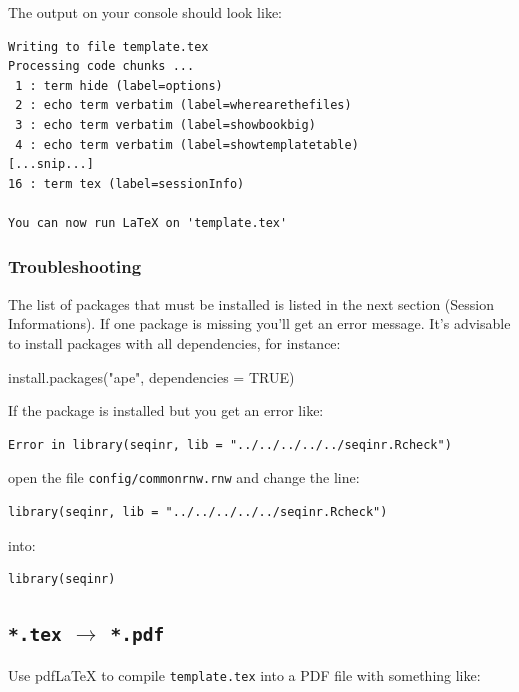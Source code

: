 \documentclass{article}
\begin{document}
The output on your \Rlogo{} console should look like:

\begin{verbatim}
Writing to file template.tex
Processing code chunks ...
 1 : term hide (label=options)
 2 : echo term verbatim (label=wherearethefiles)
 3 : echo term verbatim (label=showbookbig)
 4 : echo term verbatim (label=showtemplatetable)
[...snip...]
16 : term tex (label=sessionInfo)

You can now run LaTeX on 'template.tex'
\end{verbatim}

\subsubsection{Troubleshooting}

The list of \Rlogo{} packages that must be installed is listed
in the next section (Session Informations). 
If one package is missing you'll get an error message.
It's advisable to install packages with all dependencies, for instance:

\begin{Schunk}
\begin{Sinput}
 install.packages("ape", dependencies = TRUE)
\end{Sinput}
\end{Schunk}

If the \seqinr{} package is installed but you get an error like:

\begin{verbatim}
Error in library(seqinr, lib = "../../../../../seqinr.Rcheck")
\end{verbatim}

open the file \texttt{config/commonrnw.rnw} and change the line:

\begin{verbatim}
library(seqinr, lib = "../../../../../seqinr.Rcheck")
\end{verbatim}

into:

\begin{verbatim}
library(seqinr)
\end{verbatim}

\subsection{\texttt{*.tex} $\rightarrow$ \texttt{*.pdf}}

Use pdf\LaTeX{} to compile \texttt{template.tex} into a PDF file
with something like:
\end{document}

